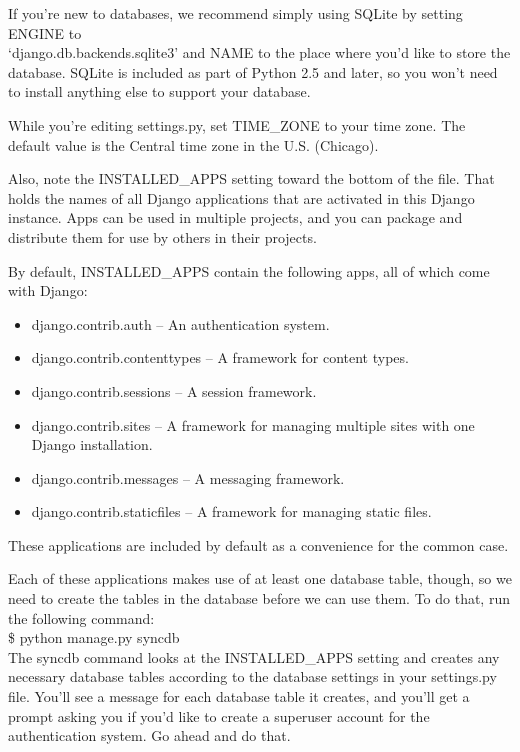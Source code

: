 If you're new to databases, we recommend simply using SQLite by setting 
ENGINE to \\`django.db.backends.sqlite3' and NAME to the place where 
you'd like to store the database. SQLite is included as part of Python 
2.5 and later, so you won't need to install anything else to support 
your database.

While you're editing settings.py, set TIME\_ZONE to your time zone. The 
default value is the Central time zone in the U.S. (Chicago).

Also, note the INSTALLED\_APPS setting toward the bottom of the file. 
That holds the names of all Django applications that are activated in 
this Django instance. Apps can be used in multiple projects, and you 
can package and distribute them for use by others in their projects.

By default, INSTALLED\_APPS contain the following apps, all of which 
come with Django:
\begin{itemize}
\item django.contrib.auth -- An authentication system.
\item django.contrib.contenttypes -- A framework for content types.
\item django.contrib.sessions -- A session framework.
\item django.contrib.sites -- A framework for managing multiple sites 
with one Django installation.
\item django.contrib.messages -- A messaging framework.
\item django.contrib.staticfiles -- A framework for managing static 
files.
\end{itemize}

These applications are included by default as a convenience for the 
common case.

Each of these applications makes use of at least one database table, 
though, so we need to create the tables in the database before we can 
use them. To do that, run the following command:\\

	\$ python manage.py syncdb\\

The syncdb command looks at the INSTALLED\_APPS setting and creates 
any necessary database tables according to the database settings in 
your settings.py file. You'll see a message for each database table it 
creates, and you'll get a prompt asking you if you'd like to create a 
superuser account for the authentication system. Go ahead and do that.

